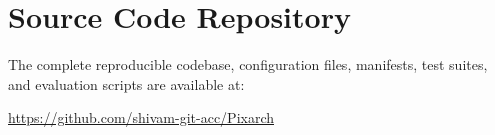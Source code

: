 \documentclass[10.5pt,twocolumn]{article}
\begin{document}
\section{Source Code Repository}
The complete reproducible codebase, configuration files, manifests, test suites, and evaluation scripts are available at:
\begin{center}
\small\url{https://github.com/shivam-git-acc/Pixarch}
\end{center}
\end{document}
